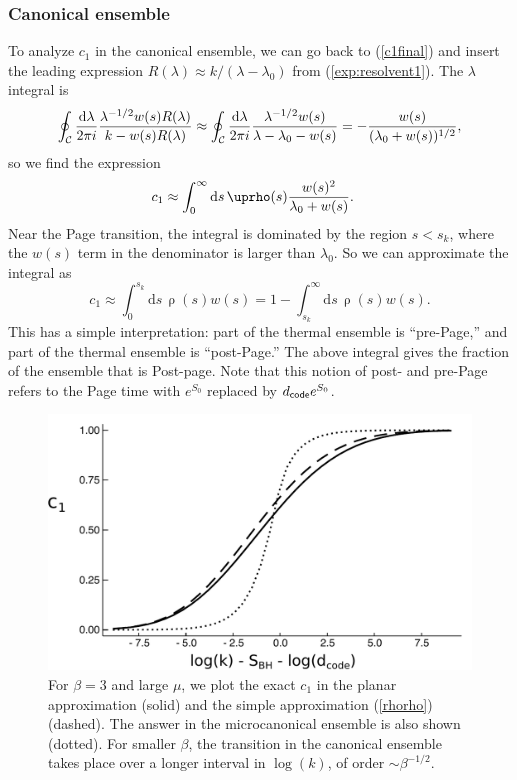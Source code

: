\documentclass[11pt]{article}
\newcommand{\be}{\begin{equation}}
\newcommand{\ee}{\end{equation}}
\numberwithin{equation}{section}
\begin{document}
\subsubsection{Canonical ensemble}
To analyze $c_1$ in the canonical ensemble, we can go back to (\ref{c1final}) and insert the leading expression $R(\lambda) \approx k/(\lambda-\lambda_0)$ from (\ref{exp:resolvent1}). The $\lambda$ integral is
\be
\oint_{\mathcal{C}} \frac{\mathrm{d}\lambda}{2\pi i} {\lambda^{-1/2}w(s)R(\lambda)\over k -w(s)R(\lambda)}\approx \oint_{\mathcal{C}} \frac{\mathrm{d}\lambda}{2\pi i}\frac{\lambda^{-1/2}w(s)}{\lambda - \lambda_0 - w(s)}=-\frac{w(s)}{(\lambda_0 + w(s))^{1/2}},\label{LHScorr}
\ee
so we find the expression
\begin{align}
c_1&\approx \int_{0}^{\infty}\mathrm{d}s\,\uprho(s){w(s)^2\over \lambda_{0}+w(s)}\label{rhorho}.%
\end{align}
Near the Page transition, the integral is dominated by the region $s < s_k$, where the $w(s)$ term in the denominator is larger than $\lambda_0$. So we can approximate the integral as 
\be
c_1 \approx \int_0^{s_k} \mathrm{d}s\,\uprho(s) w(s) = 1 - \int_{s_k}^\infty \mathrm{d}s\,\uprho(s)w(s).\label{corrone}
\ee
This has a simple interpretation: part of the thermal ensemble is ``pre-Page,'' and part of the thermal ensemble is ``post-Page.'' The above integral gives the fraction of the ensemble that is Post-page. Note that this notion of post- and pre-Page refers to the Page time with $e^{S_0}$ replaced by $d_{\sf{code}}e^{S_0}$.

\begin{figure}[t]
\begin{center}
\includegraphics[width = .45\textwidth]{images/petz2.pdf}
\caption{{\small For $\beta = 3$ and large $\mu$, we plot the exact $c_1$ in the planar approximation (solid) and the simple approximation (\ref{rhorho}) (dashed). The answer in the microcanonical ensemble is also shown (dotted). For smaller $\beta$, the transition in the canonical ensemble takes place over a longer interval in $\log(k)$, of order $\sim\beta^{-1/2}$.}}\label{fig:petzerror}
\end{center}
\end{figure}
\end{document}
